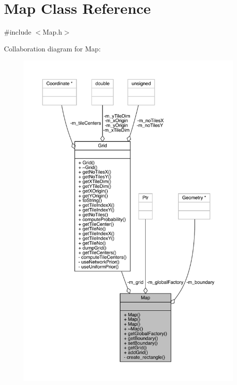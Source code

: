 \hypertarget{class_map}{}\section{Map Class Reference}
\label{class_map}


{\ttfamily \#include $<$Map.\+h$>$}



Collaboration diagram for Map\+:\nopagebreak
\begin{figure}[H]
\begin{center}
\leavevmode
\includegraphics[width=350pt]{class_map__coll__graph}
\end{center}
\end{figure}
